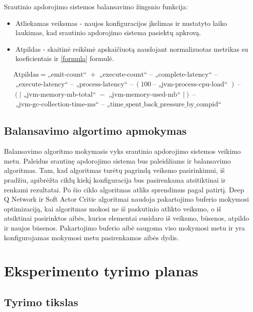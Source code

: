 \documentclass{VUMIFPSbakalaurinis}
\begin{document}
Srautinio apdorojimo sistemos balansavimo žingsnio funkcija:
\begin{itemize}
 \item Atliekamas veiksmas -  naujos konfiguracijos įkelimas ir nustatyto laiko laukimas, kad srautinio apdorojimo sistema pasiektų apkrovą.
 \item Atpildas - skaitinė reikšmė apskaičiuotą naudojant normalizuotas metrikas su koeficientais ir \ref{formula} formulė.
\end{itemize}
\begin{equation}
    \label{formula}
    \begin{gathered}
    \text{Atpildas} = \text{„emit-count“ } + \text{ „execute-count“ } – \text{ „complete-latency“ } – \\ 
        \text{ „execute-latency“ } –  \text{ „process-latency“ } – \: (100 \: – \text{ „jvm-process-cpu-load“ })\: – \\
        (|\text{ „jvm-memory-mb-total“ } - \text{ „jvm-memory-used-mb“ }|) \: – \\
    \text{ „jvm-gc-collection-time-ms“ } –\text{ „time\_spent\_back\_pressure\_by\_compid“ } 
    \end{gathered}
\end{equation}
\subsection{Balansavimo algortimo apmokymas}

Balansavimo algoritmo mokymasis vyks srautinio apdorojimo sistemos veikimo metu. Paleidus srautinę apdorojimo sistema bus paleidžiams ir balansavimo algoritmas. Tam, kad algoritmas turėtų pagrindą veiksmo pasirinkimui, iš pradžiu, apibrėžta ciklų kiekį konfiguracija bus pasirenkama atsitiktinai ir renkami rezultatai. Po šio ciklo algoritmas atliks sprendimus pagal patirtį. Deep Q Network ir Soft Actor Critic algoritmai naudoja pakartojimo buferio mokymosi optimizaciją, kai algoritmas mokosi ne iš paskutinio atlikto veiksmo, o iš atsiktinai pasirinktos aibės, kurios elementai susidaro iš veiksmo, būsenos, atpildo ir naujos būsenos. Pakartojimo buferio aibė saugoma viso mokymosi metu ir yra konfigurojamas mokymosi metu pasirenkamos aibės dydis. 

\section{Eksperimento tyrimo planas}

\subsection{Tyrimo tikslas}
\end{document}
